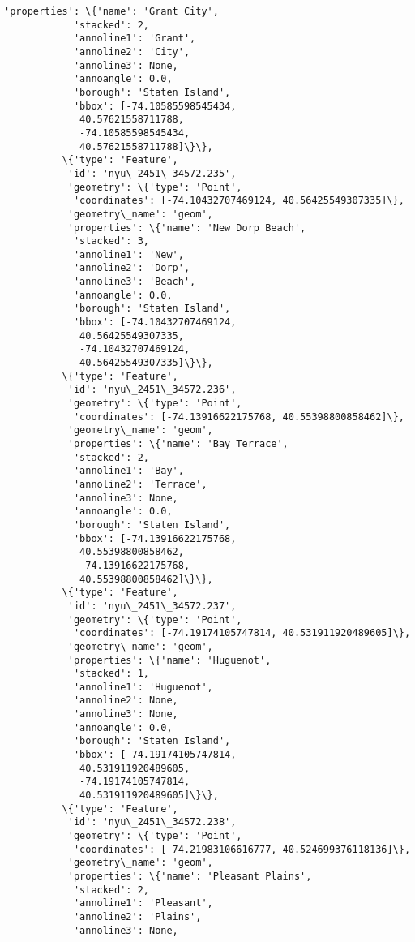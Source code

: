 \documentclass[11pt]{article}
\begin{document}
\begin{Verbatim}[commandchars=\\\{\}]
           'properties': \{'name': 'Grant City',
            'stacked': 2,
            'annoline1': 'Grant',
            'annoline2': 'City',
            'annoline3': None,
            'annoangle': 0.0,
            'borough': 'Staten Island',
            'bbox': [-74.10585598545434,
             40.57621558711788,
             -74.10585598545434,
             40.57621558711788]\}\},
          \{'type': 'Feature',
           'id': 'nyu\_2451\_34572.235',
           'geometry': \{'type': 'Point',
            'coordinates': [-74.10432707469124, 40.56425549307335]\},
           'geometry\_name': 'geom',
           'properties': \{'name': 'New Dorp Beach',
            'stacked': 3,
            'annoline1': 'New',
            'annoline2': 'Dorp',
            'annoline3': 'Beach',
            'annoangle': 0.0,
            'borough': 'Staten Island',
            'bbox': [-74.10432707469124,
             40.56425549307335,
             -74.10432707469124,
             40.56425549307335]\}\},
          \{'type': 'Feature',
           'id': 'nyu\_2451\_34572.236',
           'geometry': \{'type': 'Point',
            'coordinates': [-74.13916622175768, 40.55398800858462]\},
           'geometry\_name': 'geom',
           'properties': \{'name': 'Bay Terrace',
            'stacked': 2,
            'annoline1': 'Bay',
            'annoline2': 'Terrace',
            'annoline3': None,
            'annoangle': 0.0,
            'borough': 'Staten Island',
            'bbox': [-74.13916622175768,
             40.55398800858462,
             -74.13916622175768,
             40.55398800858462]\}\},
          \{'type': 'Feature',
           'id': 'nyu\_2451\_34572.237',
           'geometry': \{'type': 'Point',
            'coordinates': [-74.19174105747814, 40.531911920489605]\},
           'geometry\_name': 'geom',
           'properties': \{'name': 'Huguenot',
            'stacked': 1,
            'annoline1': 'Huguenot',
            'annoline2': None,
            'annoline3': None,
            'annoangle': 0.0,
            'borough': 'Staten Island',
            'bbox': [-74.19174105747814,
             40.531911920489605,
             -74.19174105747814,
             40.531911920489605]\}\},
          \{'type': 'Feature',
           'id': 'nyu\_2451\_34572.238',
           'geometry': \{'type': 'Point',
            'coordinates': [-74.21983106616777, 40.524699376118136]\},
           'geometry\_name': 'geom',
           'properties': \{'name': 'Pleasant Plains',
            'stacked': 2,
            'annoline1': 'Pleasant',
            'annoline2': 'Plains',
            'annoline3': None,

\end{Verbatim}
\end{document}
